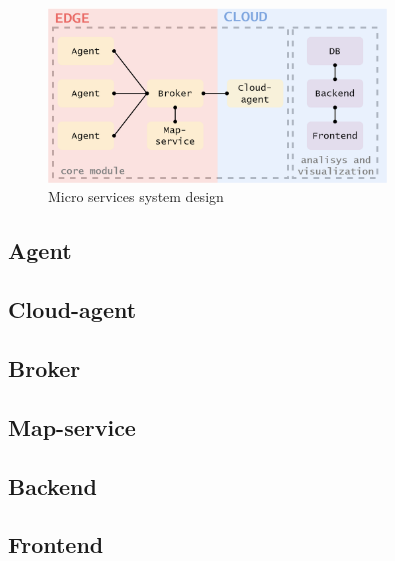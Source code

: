 
\begin{figure}[H]
    \centering
    \includegraphics[width=0.8\textwidth]{pictures/services.png}
    \caption{ Micro services system design }
    \label{fig:micro_services}
\end{figure}

\subsection{Agent}
\subsection{Cloud-agent}
\subsection{Broker}
\subsection{Map-service}
\subsection{Backend}
\subsection{Frontend}
